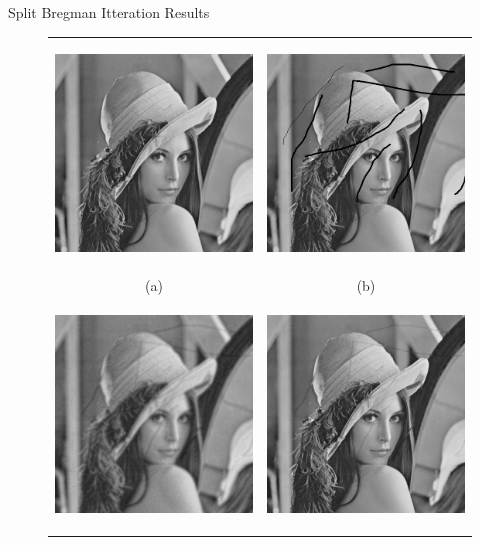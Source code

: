 \documentclass[a4paper, 15pt]{article}
\begin{document}
	\newpage
	\begin{center}
		{\fontsize{20}{30}\selectfont Split Bregman Itteration Results}\
	\end{center}
	\begin{figure}[!h]
		\centering 
		\begin{tabular}{cc}
			\includegraphics[width=6cm, height=6cm]{Lena512.png} &\hspace{-8pt}
			\includegraphics[width=6cm, height=6cm]{observationBregman.png}\\
			(a) & (b) \\
			\includegraphics[width=6cm, height=6cm]{estimationBregman.png} &\hspace{-8pt}
			\includegraphics[width=6cm, height=6cm]{bestestimationBregman.png}\\

\end{tabular}
\end{figure}
\end{document}
